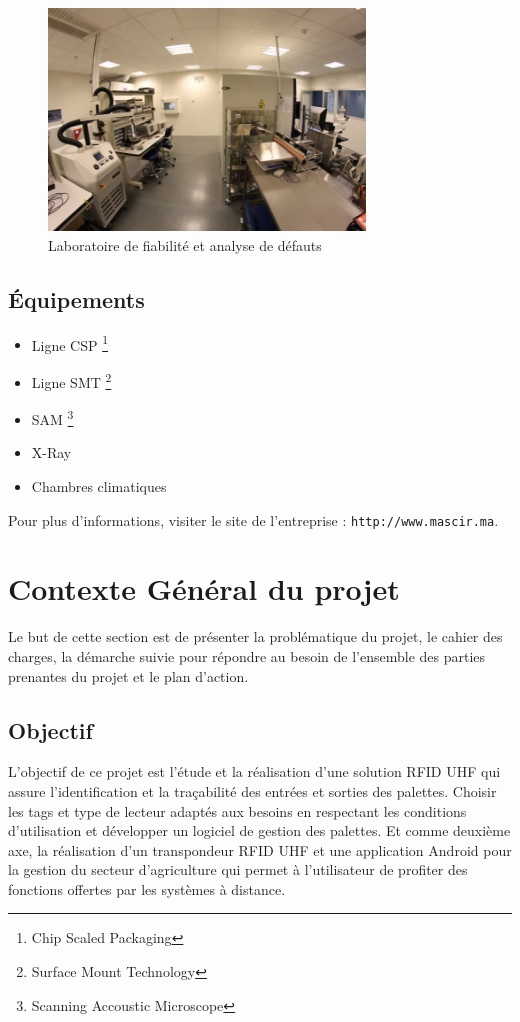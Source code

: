 \documentclass[11pt, a4paper, twoside]{book}
\begin{document}
\begin{figure}[H]
\centering
\includegraphics[width=0.75\textwidth]{labo}
\caption{Laboratoire de fiabilité et analyse de défauts}
\end{figure}

\subsection{Équipements}
\begin{itemize}
\item Ligne CSP \footnote{Chip Scaled Packaging}
\item Ligne SMT \footnote{Surface Mount Technology}
\item SAM \footnote{Scanning Accoustic Microscope}
\item X-Ray
\item Chambres climatiques
\end{itemize}

Pour plus d'informations, visiter le site de l'entreprise : \texttt{http://www.mascir.ma}.


\section{Contexte Général du projet}
Le but de cette section est de présenter la problématique du projet, le cahier des charges, la démarche suivie pour répondre au besoin de l’ensemble des parties prenantes du projet et le plan d’action.

\subsection{Objectif}
L’objectif de ce projet est l'étude et la réalisation d’une solution RFID UHF qui assure l’identification et la traçabilité des entrées et sorties des palettes. Choisir les tags et type de lecteur adaptés aux besoins en respectant les conditions d’utilisation et  développer un logiciel de gestion des palettes. 
Et comme deuxième axe, la réalisation d’un transpondeur RFID UHF et une application Android pour la gestion du secteur d'agriculture qui permet à l’utilisateur de profiter des fonctions offertes par les systèmes à distance. \\
\end{document}

